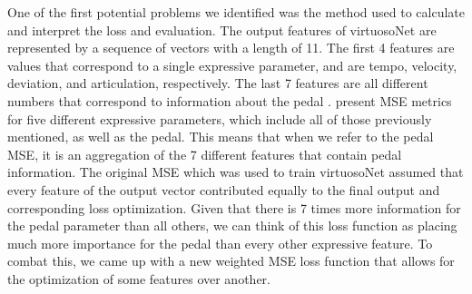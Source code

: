 One of the first potential problems we identified was the method used to calculate and interpret the loss and evaluation. The output features of virtuosoNet are represented by a sequence of vectors with a length of 11. The first 4 features are values that correspond to a single expressive parameter, and are tempo, velocity, deviation, and articulation, respectively. The last 7 features are all different numbers that correspond to information about the pedal \cite{jeong2019score}. \citet{jeong2019virtuosonet} present MSE metrics for five different expressive parameters, which include all of those previously mentioned, as well as the pedal. This means that when we refer to the pedal MSE, it is an aggregation of the 7 different features that contain pedal information. The original MSE which was used to train virtuosoNet assumed that every feature of the output vector contributed equally to the final output and corresponding loss optimization. Given that there is 7 times more information for the pedal parameter than all others, we can think of this loss function as placing much more importance for the pedal than every other expressive feature. To combat this, we came up with a new weighted MSE loss function that allows for the optimization of some features over another. 

\newcommand{\rvec}[1]{\mb{#1}}

\newcommand{\vn}{\rvec{v}}
\newcommand{\vh}{\rvec{\hat{v}}}

\newcommand{\df}[1]{(\vn_{#1} - \vh_{#1})^2}

\newcommand{\al}[1]{\alpha_{#1}}


